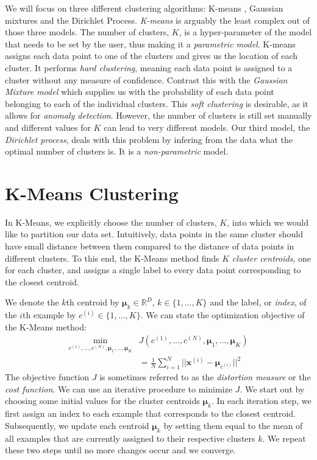 \documentclass[final,3p,times,twocolumn]{elsarticle}
\begin{document}
We will focus on three different clustering algorithms: K-means \cite{lloyd1982}, Gaussian mixtures and the Dirichlet Process. \emph{K-means} is arguably the least complex out of those three models. The number of clusters, $K$, is a hyper-parameter of the model that needs to be set by the user, thus making it a \emph{parametric model}. K-means assigns each data point to one of the clusters and gives us the location of each cluster. It performs \emph{hard clustering}, meaning each data point is assigned to a cluster without any measure of confidence. Contrast this with the \emph{Gaussian Mixture model} which supplies us with the probability of each data point belonging to each of the individual clusters. This \emph{soft clustering} is desirable, as it allows for \emph{anomaly detection}. However, the number of clusters is still set manually and different values for $K$ can lead to very different models. Our third model, the \emph{Dirichlet process}, deals with this problem by infering from the data what the optimal number of clusters is. It is a \emph{non-parametric} model.
 
\section{K-Means Clustering}
In K-Means, we explicitly choose the number of clusters, $K$, into which we would like to partition our data set. Intuitively, data points in the same cluster should have small distance between them compared to the distance of data points in different clusters. To this end, the K-Means method finds $K$ \emph{cluster centroids}, one for each cluster, and assigns a single label to every data point corresponding to the closest centroid. 

We denote the $k$th centroid by $\boldsymbol{\mu}_k \in \mathbb{R}^D$, $k \in \{1, \dots, K\}$ and the label, or \emph{index}, of the $i$th example by $c^{(i)} \in \{1, \dots, K\}$. We can state the optimization objective of the K-Means method:
\begin{equation}
\begin{split}
\min_{c^{(1)},\dots,c^{(N)},\boldsymbol{\mu}_1,\dots,\boldsymbol{\mu}_K} &J(c^{(1)},\dots,c^{(N)},\boldsymbol{\mu}_1,\dots,\boldsymbol{\mu}_K) \\
&= \frac{1}{N}\sum_{i=1}^N ||\boldsymbol{x}^{(i)} - \boldsymbol{\mu}_{c^{(i)}}||^2
\end{split}
\label{eqn:kmeansCost}
\end{equation}
The objective function $J$ is sometimes referred to as the \emph{distortion measure} or the \emph{cost function}. We can use an iterative procedure to minimize $J$. We start out by choosing some initial values for the cluster centroids $\boldsymbol{\mu}_k$. In each iteration step, we first assign an index to each example that corresponds to the closest centroid. Subsequently, we update each centroid $\boldsymbol{\mu}_k$ by setting them equal to the mean of all examples that are currently assigned to their respective clusters $k$. We repeat these two steps until no more changes occur and we converge.
\end{document}

